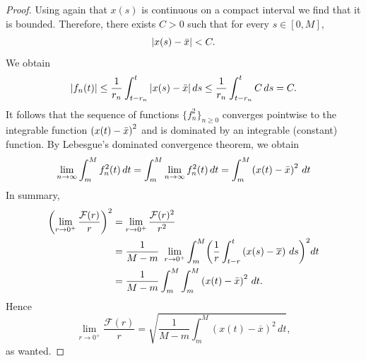 \documentclass[10pt,a4paper]{amsart}
\begin{document}
\begin{proof}
Using again that $x(s)$ is continuous on a compact interval we find that it is bounded. Therefore, there exists $C>0$ such that for every $s\in[0,M]$,
\begin{equation*}
    |x(s)-\Bar{x}|<C. 
\end{equation*}
We obtain
\begin{equation*}
    |f_n(t)|\leq\frac{1}{r_n}\int_{t-r_n}^{t}|x(s)-\Bar{x}|\,ds\leq\frac{1}{r_n}\int_{t-r_n}^{t}C\,ds=C.
\end{equation*}
It follows that the sequence of functions $\{f_n^2\}_{n\geq 0}$ converges pointwise to the integrable function $\left(x(t)-\Bar{x}\right)^2$ and is dominated by an
integrable (constant) function. By Lebesgue's dominated convergence theorem, we obtain
\begin{equation*}   \lim_{n\to\infty}\int_{m}^{M}f_n^2(t)\,dt=\int_{m}^{M}\lim_{n\to\infty}f_{n}^{2}(t)\, dt=\int_{m}^{M}\left(x(t)-\Bar{x}\right)^2\, dt
\end{equation*}
In summary,
\begin{align*}
   \biggl(\lim_{r\to 0^{+}}  \frac{\mathcal{F}(r)}{r}\biggr)^2&= \lim_{r\to 0^{+}}  \frac{\mathcal{F}(r)^2}{r^2} \\
   &=\frac{1}{M-m}\ \lim_{r\to 0^{+}}\int_{m}^{M}\biggl( \frac{1}{r}\int_{t-r}^{t}\left(x(s)-\overline{x}\right)\, ds\biggr)^2dt\\
   &=\frac{1}{M-m}\int_{m}^{M}\int_{m}^{M}\left(x(t)-\Bar{x}\right)^2\, dt.
\end{align*}
Hence
\begin{equation*}
    \lim_{r\to 0^+} \frac{\mathcal{F}(r)}{r} =\sqrt{\frac{1}{M-m}\int_{m}^{M}\left(x\left(t\right)-\overline{x}\right)^2\, dt},
\end{equation*} 
 as wanted.  
 \end{proof}
\end{document}
